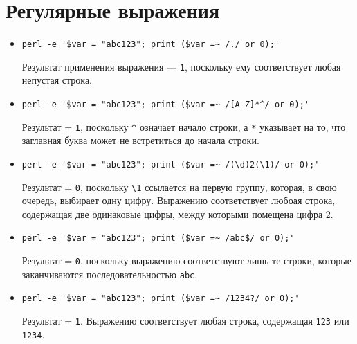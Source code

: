 \documentclass[listings]{labreport}
\begin{document}
\maketitlepage

\section*{Регулярные выражения}

\begin{itemize}
\item \verb|perl -e '$var = "abc123"; print ($var =~ /./ or 0);'|

Результат применения выражения — \texttt{1},
поскольку ему соответствует любая непустая строка.

\item \verb|perl -e '$var = "abc123"; print ($var =~ /[A-Z]*^/ or 0);'|

Результат = \texttt{1}, поскольку \verb|^| означает начало строки, а \verb|*|
указывает на то, что заглавная буква может не встретиться до начала строки.

\item \verb|perl -e '$var = "abc123"; print ($var =~ /(\d)2(\1)/ or 0);'|

Результат = \texttt{0}, поскольку \verb|\1| ссылается на первую группу,
которая, в свою очередь, выбирает одну цифру. Выражению соответствует
любоая строка, содержащая две одинаковые цифры, между которыми помещена цифра 2.

\item \verb|perl -e '$var = "abc123"; print ($var =~ /abc$/ or 0);'|

Результат = \texttt{0}, поскольку выражению соответствуют лишь те строки,
которые заканчиваются последовательностью \texttt{abc}.

\item \verb|perl -e '$var = "abc123"; print ($var =~ /1234?/ or 0);'|

Результат = \texttt{1}. Выражению соответствует любая строка, содержащая
\texttt{123} или \texttt{1234}.
\end{itemize}
\end{document}
